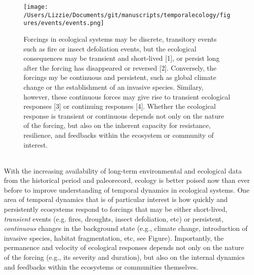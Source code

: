 \documentclass[11pt,a4paper,oneside]{article}
\begin{document}
\clearpage
\begin{figure}[h!]
\centering
\noindent \texttt{[image: /Users/Lizzie/Documents/git/manuscripts/temporalecology/figures/events/events.png]}
\caption{Forcings in ecological systems may be discrete, transitory events such as fire or insect defoliation events, but the ecological consequences may be transient and short-lived [1], or persist long after the forcing has disappeared or reversed [2]. Conversely, the forcings my be continuous and persistent, such as global climate change or the establishment of an invasive species. Similary, however, these continuous forces may give rise to transient ecological responses [3] or continuing responses [4]. Whether the ecological response is transient or continuous depends not only on the nature of the forcing, but also on the inherent capacity for resistance, resilience, and feedbacks within the ecosystem or community of interest.}
\end{figure}

\\
\noindent With the increasing availability of long-term environmental and ecological data from the historical period and paleorecord, ecology is better poised now than ever before to improve understanding of temporal dynamics in ecological systems. One area of temporal dynamics that is of particular interest is how quickly and persistently ecosystems respond to forcings that may be either short-lived, \emph{transient} events (e.g. fires, droughts, insect defoliation, etc) or persistent, \emph{continuous} changes in the background state (e.g., climate change, introduction of invasive species, habitat fragmentation, etc, see Figure). Importantly, the permanence and velocity of ecological responses depends not only on the nature of the forcing (e.g., its severity and duration), but also on the internal dynamics and feedbacks within the ecosystems or communities themselves.\\
\end{document}
